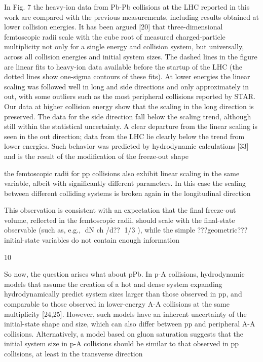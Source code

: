 In Fig. 7 the heavy-ion data from Pb-Pb collisions at the
LHC reported in this work are compared with the previous
measurements, including results obtained at lower collision
energies. It has been argued [20] that three-dimensional
femtoscopic radii scale with the cube root of measured
charged-particle multiplicity not only for a single energy and
collision system, but universally, across all collision energies
and initial system sizes. The dashed lines in the figure are
linear fits to heavy-ion data available before the startup of
the LHC (the dotted lines show one-sigma contours of these
fits). At lower energies the linear scaling was followed well in
long and side directions and only approximately in out, with
some outliers such as the most peripheral collisions reported
by STAR. Our data at higher collision energy show that the
scaling in the long direction is preserved. The data for the side
direction fall below the scaling trend, although still within
the statistical uncertainty. A clear departure from the linear
scaling is seen in the out direction; data from the LHC lie
clearly below the trend from lower energies. Such behavior
was predicted by hydrodynamic calculations [33] and is the
result of the modification of the freeze-out shape

the femtoscopic
radii for pp collisions also exhibit linear scaling in the same
variable, albeit with significantly different parameters. In this
case the scaling between different colliding systems is broken
again in the longitudinal direction

This observation is consistent with an expectation
that the final freeze-out volume, reflected in the femtoscopic
radii, should scale with the final-state observable (such as,
e.g., dN ch /d?? 1/3 ), while the simple ???geometric??? initial-state
variables do not contain enough information

10

So now, the question arises what about pPb.
In p-A collisions, hydrodynamic
models that assume the creation of a hot and dense system
expanding hydrodynamically predict system sizes larger than
those observed in pp, and comparable to those observed in
lower-energy A-A collisions at the same multiplicity [24,25].
However, such models have an inherent uncertainty of the
initial-state shape and size, which can also differ between pp
and peripheral A-A collisions.
Alternatively, a model based on gluon saturation suggests
that the initial system size in p-A collisions should be similar
to that observed in pp collisions, at least in the transverse
direction

